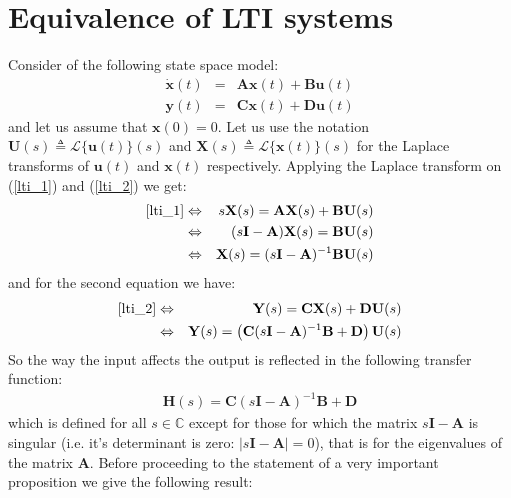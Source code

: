 \documentclass[a4paper,10pt,oneside]{book}
\begin{document}
\section{Equivalence of LTI systems}
Consider of the following state space model:
\begin{eqnarray}
\dot{\mathbf{x}}(t)&=&\mathbf{Ax}(t)+ \mathbf{Bu}(t)\label{lti_1}\\
\mathbf{y}(t)&=&\mathbf{Cx}(t)+ \mathbf{Du}(t)\label{lti_2}
\end{eqnarray} 
and let us assume that $\mathbf{x}(0)=0$. Let us use the notation $\mathbf{U}(s)\triangleq\mathcal{L}\{\mathbf{u}(t)\}(s)$ and $\mathbf{X}(s)\triangleq\mathcal{L}\{\mathbf{x}(t)\}(s)$ for the Laplace transforms of $\mathbf{u}(t)$ and $\mathbf{x}(t)$ respectively. Applying the Laplace transform on (\ref{lti_1}) and (\ref{lti_2}) we get:
\begin{eqnarray}
\text{\ref{lti_1}}&\Leftrightarrow&s\mathbf{X}(s)=\mathbf{AX}(s)+\mathbf{BU}(s)\\
		  &\Leftrightarrow&(s\mathbf{I}-\mathbf{A})\mathbf{X}(s)=\mathbf{BU}(s)\\
 		  &\Leftrightarrow&\mathbf{X}(s)=(s\mathbf{I}-\mathbf{A})^{-1}\mathbf{BU}(s)
\end{eqnarray} 
and for the second equation we have:
\begin{eqnarray}
\text{\ref{lti_2}}&\Leftrightarrow&\mathbf{Y}(s)=\mathbf{CX}(s)+\mathbf{DU}(s)\\
		  &\Leftrightarrow&\mathbf{Y}(s)=\left( \mathbf{C}(s\mathbf{I}-\mathbf{A})^{-1}\mathbf{B}+\mathbf{D} \right)\mathbf{U}(s)
\end{eqnarray} 
So the way the input affects the output is reflected in the following transfer function:
\begin{eqnarray}
\mathbf{H}(s)=\mathbf{C}(s\mathbf{I}-\mathbf{A})^{-1}\mathbf{B}+\mathbf{D}	  
\end{eqnarray} 
which is defined for all $s\in\mathbb{C}$ except for those for which the matrix $s\mathbf{I}-\mathbf{A}$ is singular (i.e. it's determinant is zero: $|s\mathbf{I}-\mathbf{A}|=0$), that is for the eigenvalues of the matrix $\mathbf{A}$. Before proceeding to the statement of a very important proposition we give the following result:
\end{document}
